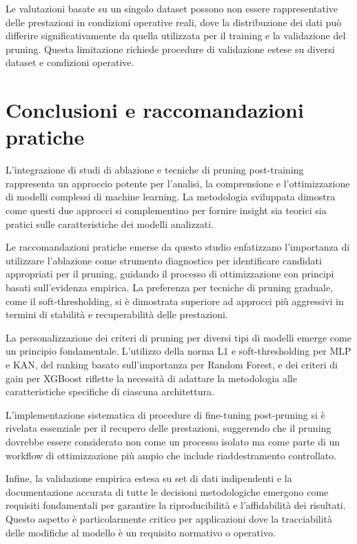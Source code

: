 \documentclass[a4paper,12pt]{report}
\begin{document}
	Le valutazioni basate su un singolo dataset possono non essere rappresentative delle prestazioni in condizioni operative reali, dove la distribuzione dei dati può differire significativamente da quella utilizzata per il training e la validazione del pruning. Questa limitazione richiede procedure di validazione estese su diversi dataset e condizioni operative.
	
	\section{Conclusioni e raccomandazioni pratiche}
	
	L'integrazione di studi di ablazione e tecniche di pruning post-training rappresenta un approccio potente per l'analisi, la comprensione e l'ottimizzazione di modelli complessi di machine learning. La metodologia sviluppata dimostra come questi due approcci si complementino per fornire insight sia teorici sia pratici sulle caratteristiche dei modelli analizzati.
	
	Le raccomandazioni pratiche emerse da questo studio enfatizzano l'importanza di utilizzare l'ablazione come strumento diagnostico per identificare candidati appropriati per il pruning, guidando il processo di ottimizzazione con principi basati sull'evidenza empirica. La preferenza per tecniche di pruning graduale, come il soft-thresholding, si è dimostrata superiore ad approcci più aggressivi in termini di stabilità e recuperabilità delle prestazioni.
	
	La personalizzazione dei criteri di pruning per diversi tipi di modelli emerge come un principio fondamentale. L'utilizzo della norma L1 e soft-thresholding per MLP e KAN, del ranking basato sull'importanza per Random Forest, e dei criteri di gain per XGBoost riflette la necessità di adattare la metodologia alle caratteristiche specifiche di ciascuna architettura.
	
	L'implementazione sistematica di procedure di fine-tuning post-pruning si è rivelata essenziale per il recupero delle prestazioni, suggerendo che il pruning dovrebbe essere considerato non come un processo isolato ma come parte di un workflow di ottimizzazione più ampio che include riaddestramento controllato.
	
	Infine, la validazione empirica estesa su set di dati indipendenti e la documentazione accurata di tutte le decisioni metodologiche emergono come requisiti fondamentali per garantire la riproducibilità e l'affidabilità dei risultati. Questo aspetto è particolarmente critico per applicazioni dove la tracciabilità delle modifiche al modello è un requisito normativo o operativo.
	
\end{document}

